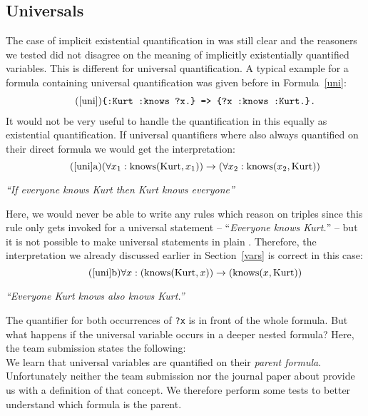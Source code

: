\subsection{Universals}\label{universals}
The case of implicit existential quantification in \nthree was still clear and the reasoners we tested did not disagree on the meaning of implicitly existentially 
quantified variables. This is different for universal quantification. A typical example for a formula containing universal quantification was given before in Formula~\ref{uni}:
\begin{multline}\tag{\ref{uni}}
 \texttt{\{:Kurt :knows ?x.\} => }%
 \texttt{\{?x :knows :Kurt.\}.}%
\end{multline}
It would not be very useful to handle the quantification in this equally as existential quantification. If universal quantifiers where also always quantified on their direct 
formula we would get the interpretation:
\[\tag{\ref{uni}a}
(\forall x_1: \text{knows}(\text{Kurt}, x_1))\rightarrow (\forall x_2: \text{knows}(x_2, \text{Kurt}))
\]
\begin{center}\textit{``If everyone knows Kurt then Kurt knows everyone''}
  \end{center}
Here, we would never be able to write any rules which reason on \rdf triples since this rule only gets invoked for a universal statement -- ``\textit{Everyone knows Kurt.}'' 
--  but it is not possible to 
make universal statements in plain \rdf. Therefore, the interpretation we already discussed earlier in Section~\ref{vars} is correct in this case:
\[\tag{\ref{uni}b}
\forall x:(\text{knows}(\text{Kurt}, x))\rightarrow (\text{knows}(x, \text{Kurt}))
\]
\begin{center}\textit{``Everyone Kurt knows also knows Kurt.''}
  \end{center}
The quantifier for both occurrences of \texttt{?x} is in front of the whole formula. But what happens if the universal variable occurs in a deeper nested formula? 
% 
% 
%
Here,
the \wwwc team submission states the following:\\

We learn that universal variables are quantified on their \emph{parent formula}. Unfortunately neither the \wwwc team submission nor the journal paper about \nthreelogic 
provide us with a definition of that concept. We therefore perform some tests to better understand which formula is the parent.
 
